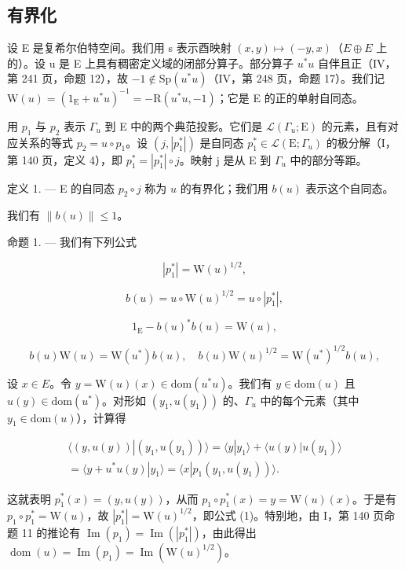 \subsection{有界化}

设 E 是复希尔伯特空间。我们用 s 表示酉映射 \((x,y)\mapsto(-y,x)\)（\(E\oplus E\) 上的）。设 u 是 E 上具有稠密定义域的闭部分算子。部分算子 \(u^{*}u\) 自伴且正（IV，第 241 页，命题 12），故 \(-1\notin\mathrm{Sp}(u^{*}u)\)（IV，第 248 页，命题 17）。我们记 \(\mathrm{W}(u)=(1_{\mathrm{E}}+u^{*}u)^{-1}=-\mathrm{R}(u^{*}u,-1)\)；它是 E 的正的单射自同态。

用 \(p_{1}\) 与 \(p_{2}\) 表示 \(\Gamma_{u}\) 到 E 中的两个典范投影。它们是 \(\mathcal{L}(\Gamma_{u};\mathrm{E})\) 的元素，且有对应关系的等式 \(p_{2}=u\circ p_{1}\)。设 \((j,|p_{1}^{*}|)\) 是自同态 \(p_{1}^{*}\in\mathcal{L}(\mathrm{E};\Gamma_{u})\) 的极分解（I，第 140 页，定义 4），即 \(p_{1}^{*}=|p_{1}^{*}|\circ j\)。映射 j 是从 E 到 \(\Gamma_{u}\) 中的部分等距。

定义 1. --- E 的自同态 \(p_2 \circ j\) 称为 \(u\) 的有界化；我们用 \(b(u)\) 表示这个自同态。

我们有 \(\|b(u)\|\leqslant1\)。

命题 1. --- 我们有下列公式

\[
| p _ {1} ^ {*} | = \mathrm{W} (u) ^ {1 / 2},\tag{1}
\]

\[
b (u) = u \circ \mathrm{W} (u) ^ {1 / 2} = u \circ | p _ {1} ^ {*} |,\tag{2}
\]

\[
1 _ {\mathrm{E}} - b (u) ^ {*} b (u) = \mathrm{W} (u),\tag{3}
\]

\[
b (u) \mathrm{W} (u) = \mathrm{W} (u ^ {*}) b (u), \quad b (u) \mathrm{W} (u) ^ {1 / 2} = \mathrm{W} (u ^ {*}) ^ {1 / 2} b (u),\tag{4}
\]

设 \(x \in E\)。令 \(y = \mathrm{W}(u)(x) \in \mathrm{dom}(u^{*}u)\)。我们有 \(y \in \mathrm{dom}(u)\) 且 \(u(y) \in \mathrm{dom}(u^{*})\)。对形如 \((y_{1}, u(y_{1}))\) 的、\(\Gamma_{u}\) 中的每个元素（其中 \(y_{1} \in \mathrm{dom}(u)\)），计算得

\[
\begin{array}{c} \langle (y, u (y)) | (y _ {1}, u (y _ {1})) \rangle = \langle y | y _ {1} \rangle + \langle u (y) | u (y _ {1}) \rangle \\ = \langle y + u ^ {*} u (y) | y _ {1} \rangle = \langle x | p _ {1} (y _ {1}, u (y _ {1})) \rangle . \end{array}
\]

这就表明 \(p_{1}^{*}(x) = (y, u(y))\)，从而 \(p_{1} \circ p_{1}^{*}(x) = y = \mathrm{W}(u)(x)\)。于是有 \(p_{1} \circ p_{1}^{*} = \mathrm{W}(u)\)，故 \(|p_{1}^{*}| = \mathrm{W}(u)^{1/2}\)，即公式 (1)。特别地，由 I，第 140 页命题 11 的推论有 \(\operatorname{Im}(p_{1}) = \operatorname{Im}(|p_{1}^{*}|)\)，由此得出 \(\operatorname{dom}(u) = \operatorname{Im}(p_{1}) = \operatorname{Im}(\mathrm{W}(u)^{1/2})\)。


